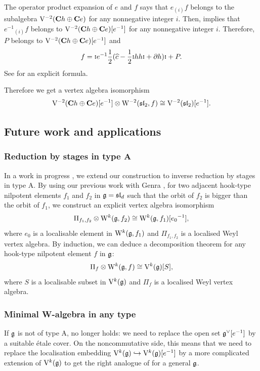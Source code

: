 The operator product expansion of $e$ and $f$ says that $e_{(i)}f$ belongs to the subalgebra $\mathrm V^{-2}(\mathbf{C} h \oplus \mathbf{C} e)$ for any nonnegative integer $i$. Then, \cite[Formula (3.1)]{arakawa2026faithful} implies that $e^{-1}{}_{(i)}f$ belongs to $\mathrm V^{-2}(\mathbf{C} h \oplus \mathbf{C} e)[e^{-1}]$ for any nonnegative integer $i$. Therefore, $P$ belongs to $\mathrm V^{-2}(\mathbf{C} h \oplus \mathbf{C} e)[e^{-1}]$ and
\[ f = \mathopen{\boldsymbol{\vcentcolon}}e^{-1} \frac{1}{2}(\widehat{c} - \frac{1}{2} \mathopen{\boldsymbol{\vcentcolon}}h h\mathclose{\boldsymbol{\vcentcolon}} + \partial h)\mathclose{\boldsymbol{\vcentcolon}} + P. \]
See  for an explicit formula.

Therefore we get a vertex algebra isomorphism
\[ \mathrm V^{-2}(\mathbf{C} h \oplus \mathbf{C} e)[e^{-1}] \otimes \mathrm W^{-2}(\mathfrak{sl}_2, f) \cong \mathrm V^{-2}(\mathfrak{sl}_2)[e^{-1}]. \]


\subsection{Future work and applications}

\subsubsection{Reduction by stages in type A}

In a work in progress \cite{juillard2027}, we extend our construction to inverse reduction by stages in type A. By using our previous work with Genra \cite{genra2024reduction,genra2025reduction}, for two adjacent hook-type nilpotent elements $f_1$ and $f_2$ in $\mathfrak g = \mathfrak{sl}_d$ such that the orbit of $f_2$ is bigger than the orbit of $f_1$, we construct an explicit vertex algebra isomorphism
\[ \Pi_{f_1, f_2} \otimes \mathrm W^k(\mathfrak g, f_2) \cong \mathrm W^k(\mathfrak g, f_1)[e_0{}^{-1}], \]
where $e_0$ is a localisable element in $\mathrm W^k(\mathfrak g, f_1)$ and $\Pi_{f_1, f_2}$ is a localised Weyl vertex algebra. By induction, we can deduce a decomposition theorem for any hook-type nilpotent element $f$ in $\mathfrak g$:
\[ \Pi_{f} \otimes \mathrm W^k(\mathfrak g, f) \cong \mathrm V^k(\mathfrak g)[S], \]
where $S$ is a localisable subset in $\mathrm V^k(\mathfrak g)$ and $\Pi_{f}$ is a localised Weyl vertex algebra.

\subsubsection{Minimal W-algebra in any type}

If $\mathfrak g$ is not of type A,  no longer holds: we need to replace the open set $\mathfrak g^\vee[e^{-1}]$ by a suitable étale cover. On the noncommutative side, this means that we need to replace the localisation embedding $\mathrm V^k(\mathfrak g) \hookrightarrow \mathrm V^k(\mathfrak g)[e^{-1}]$ by a more complicated extension of $\mathrm V^k(\mathfrak g)$ to get the right analogue of  for a general $\mathfrak g$. 

